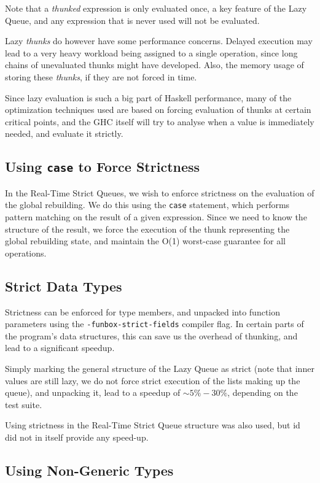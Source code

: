 Note that a \textit{thunked} expression is only evaluated once, a key feature of the Lazy Queue, and any expression that is never used will not be evaluated. 

Lazy \textit{thunks} do however have some performance concerns. Delayed execution may lead to a very heavy workload being assigned to a single operation, since long chains of unevaluated thunks might have developed. Also, the memory usage of storing these \textit{thunks}, if they are not forced in time.

Since lazy evaluation is such a big part of Haskell performance, many of the optimization techniques used are based on forcing evaluation of thunks at certain critical points, and the GHC itself will try to analyse when a value is immediately needed, and evaluate it strictly.

\subsection{Using \texttt{case} to Force Strictness}

In the Real-Time Strict Queues, we wish to enforce strictness on the evaluation of the global rebuilding. We do this using the \texttt{case} statement, which performs pattern matching on the result of a given expression. Since we need to know the structure of the result, we force the execution of the thunk representing the global rebuilding state, and maintain the O(1) worst-case guarantee for all operations.

\subsection{Strict Data Types} Strictness can be enforced for type members, and unpacked into function parameters using the \texttt{-funbox-strict-fields} compiler flag. In certain parts of the program's data structures, this can save us the overhead of thunking, and lead to a significant speedup.

Simply marking the general structure of the Lazy Queue as strict (note that inner values are still lazy, we do not force strict execution of the lists making up the queue), and unpacking it, lead to a speedup of $\sim 5\%-30\%$, depending on the test suite.

Using strictness in the Real-Time Strict Queue structure was also used, but id did not in itself provide any speed-up.

\subsection{Using Non-Generic Types}

